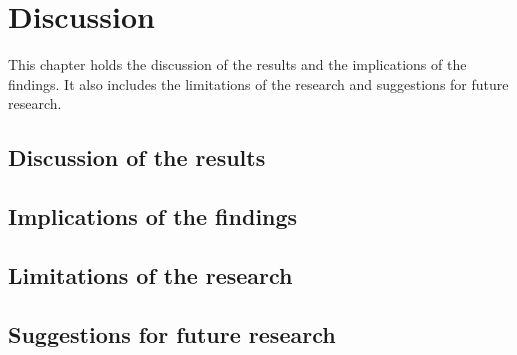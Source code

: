 \chapter{Discussion}

This chapter holds the discussion of the results and the implications of the
findings. It also includes the limitations of the research and suggestions for
future research.

\section{Discussion of the results}

\section{Implications of the findings}

\section{Limitations of the research}

\section{Suggestions for future research}